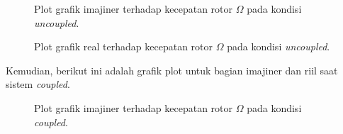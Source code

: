 \begin{figure}[h]
	\centering
	\caption{Plot grafik imajiner terhadap kecepatan rotor $\Omega$ pada kondisi \textit{uncoupled}.}
	\label{fig:imag(uncoupled)}
\end{figure}

\begin{figure}[H]
	\centering
	\caption{Plot grafik real terhadap kecepatan rotor $\Omega$ pada kondisi \textit{uncoupled}.}
	\label{fig:real(uncoupled)}
\end{figure}

Kemudian, berikut ini adalah grafik plot untuk bagian imajiner dan riil saat sistem \textit{coupled}.

\begin{figure}[H]
	\centering
	\caption{Plot grafik imajiner terhadap kecepatan rotor $\Omega$ pada kondisi \textit{coupled}.}
	\label{fig:imag(coupled)}
\end{figure}

